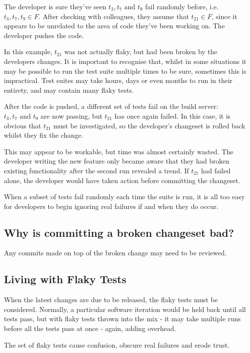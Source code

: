 The developer is sure they’ve seen $t_{3}, t_{7} \text{ and } t_{9}$ fail randomly before, i.e. $t_{3}, t_{7}, t_{9} \in F$. After checking with colleagues, they assume that $t_{21} \in F$, since it appears to be unrelated to the area of code they’ve been working on. The developer pushes the code.

In this example, $t_{21}$ was not actually flaky, but had been broken by the developers changes. It is important to recognise that, whilst in some situations it may be possible to run the test suite multiple times to be sure, sometimes this is impractical. Test suites may take hours, days or even months to run in their entirety, and may contain many flaky tests.

After the code is pushed, a different set of tests fail on the build server: $t_{3}, t_{7} \text{ and } t_{9}$ are now passing, but $t_{21}$ has once again failed. In this case, it is obvious that $t_{21}$ must be investigated, so the developer’s changeset is rolled back whilst they fix the change.

This may appear to be workable, but time was almost certainly wasted. The developer writing the new feature only became aware that they had broken existing functionality after the second run revealed a trend. If $t_{21}$ had failed alone, the developer would have taken action before committing the changeset.

When a subset of tests fail randomly each time the suite is run, it is all too easy for developers to begin ignoring real failures if and when they do occur.

\subsection{Why is committing a broken changeset bad?}

Any commits made on top of the broken change may need to be reviewed.

\subsection{Living with Flaky Tests}

When the latest changes are due to be released, the flaky tests must be considered. Normally, a particular software iteration would be held back until all tests pass, but with flaky tests thrown into the mix - it may take multiple runs before all the tests pass at once - again, adding overhead.

The set of flaky tests cause confusion, obscure real failures and erode trust.

